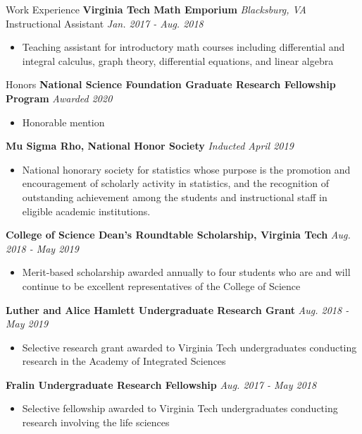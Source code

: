 \documentclass{resume} %
\begin{document}
\begin{rSection}{Work Experience}
{\bf Virginia Tech Math Emporium} \hfill {\em Blacksburg, VA} \\
{Instructional Assistant} \hfill {\em Jan. 2017 - Aug. 2018}
\begin{itemize}
    \item Teaching assistant for introductory math courses including differential and integral calculus, graph theory, differential equations, and linear algebra
\end{itemize}
\end{rSection}


\begin{rSection}{Honors}
{\bf National Science Foundation Graduate Research Fellowship Program} \hfill { \em Awarded 2020}
\begin{itemize}
    \item Honorable mention
\end{itemize}

{\bf Mu Sigma Rho, National Honor Society} \hfill { \em Inducted April 2019}
\begin{itemize}
    \item National honorary society for statistics whose purpose is the promotion and encouragement of scholarly activity in statistics, and the recognition of outstanding achievement among the students and instructional staff in eligible academic institutions.
\end{itemize}

{\bf College of Science Dean’s Roundtable Scholarship, Virginia Tech} \hfill { \em Aug. 2018 - May 2019}
\begin{itemize}
    \item Merit-based scholarship awarded annually to four students who are and will continue to be excellent representatives of the College of Science
\end{itemize}

{\bf Luther and Alice Hamlett Undergraduate Research Grant} \hfill { \em Aug. 2018 - May 2019}
\begin{itemize}
    \item Selective research grant awarded to Virginia Tech undergraduates conducting research in the Academy of Integrated Sciences
\end{itemize}

{\bf Fralin Undergraduate Research Fellowship} \hfill { \em Aug. 2017 - May 2018}
\begin{itemize}
    \item Selective fellowship awarded to Virginia Tech undergraduates conducting research involving the life sciences
\end{itemize}


\end{rSection}
\end{document}
